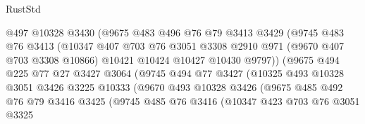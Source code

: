 \begin{lexlean}{RustStd}
\begin{coremodule}
                          @497
                          @10328
                          @3430
                          (@9675
                            @483
                            @496
                            @76
                            @79
                            @3413
                            @3429
                            (@9745
                              @483
                              @76
                              @3413
                              (@10347
                                @407
                                @703
                                @76
                                @3051
                                @3308
                                @2910
                                @971
                                (@9670 @407 @703 @3308 @10866)
                                @10421
                                @10424
                                @10427
                                @10430
                                @9797))
                            (@9675
                              @494
                              @225
                              @77
                              @27
                              @3427
                              @3064
                              (@9745
                                @494
                                @77
                                @3427
                                (@10325
                                  @493
                                  @10328
                                  @3051
                                  @3426
                                  @3225
                                  @10333
                                  (@9670
                                    @493
                                    @10328
                                    @3426
                                    (@9675
                                      @485
                                      @492
                                      @76
                                      @79
                                      @3416
                                      @3425
                                      (@9745
                                        @485
                                        @76
                                        @3416
                                        (@10347
                                          @423
                                          @703
                                          @76
                                          @3051
                                          @3325

\end{coremodule}
\end{lexlean}
